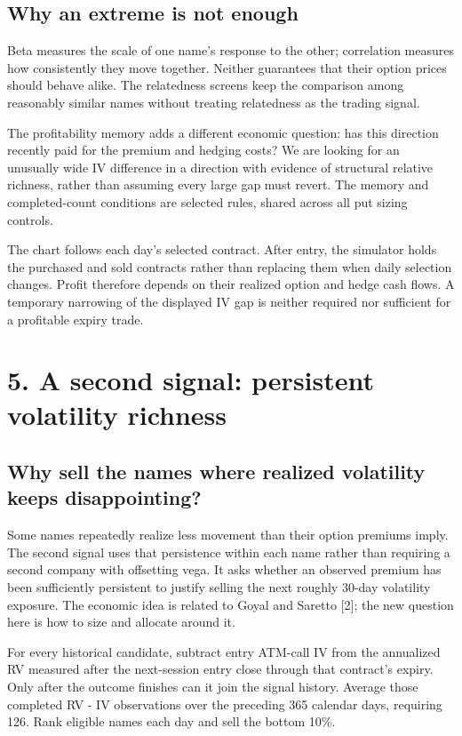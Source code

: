 \documentclass[11pt,letterpaper]{article}
\begin{document}
\subsection*{Why an extreme is not enough}
Beta measures the scale of one name's response to the other; correlation measures how consistently they move together. Neither guarantees that their option prices should behave alike. The relatedness screens keep the comparison among reasonably similar names without treating relatedness as the trading signal.

The profitability memory adds a different economic question: has this direction recently paid for the premium and hedging costs? We are looking for an unusually wide IV difference in a direction with evidence of structural relative richness, rather than assuming every large gap must revert. The memory and completed-count conditions are selected rules, shared across all put sizing controls.

The chart follows each day's selected contract. After entry, the simulator holds the purchased and sold contracts rather than replacing them when daily selection changes. Profit therefore depends on their realized option and hedge cash flows. A temporary narrowing of the displayed IV gap is neither required nor sufficient for a profitable expiry trade.

\clearpage
\section*{5. A second signal: persistent volatility richness}
\subsection*{Why sell the names where realized volatility keeps disappointing?}
Some names repeatedly realize less movement than their option premiums imply. The second signal uses that persistence within each name rather than requiring a second company with offsetting vega. It asks whether an observed premium has been sufficiently persistent to justify selling the next roughly 30-day volatility exposure. The economic idea is related to Goyal and Saretto [2]; the new question here is how to size and allocate around it.

For every historical candidate, subtract entry ATM-call IV from the annualized RV measured after the next-session entry close through that contract's expiry. Only after the outcome finishes can it join the signal history. Average those completed RV - IV observations over the preceding 365 calendar days, requiring 126. Rank eligible names each day and sell the bottom 10\%.
\end{document}
